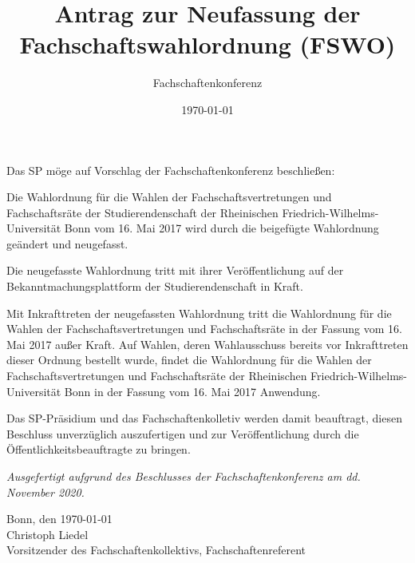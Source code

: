 \documentclass[DIV=12, parskip=half, fontsize=12pt, a4paper]{scrartcl}
\title{Antrag zur Neufassung der Fachschaftswahlordnung (FSWO)}
\author{Fachschaftenkonferenz}
\date{\today}
\begin{document}
	\maketitle
	Das SP möge auf Vorschlag der Fachschaftenkonferenz beschließen:

	\begin{linenumbers}
		Die Wahlordnung für die Wahlen der Fachschaftsvertretungen und Fachschaftsräte der Studierendenschaft der Rheinischen Friedrich-Wilhelms-Universität Bonn vom 16. Mai 2017 wird durch die beigefügte Wahlordnung geändert und neugefasst.

		Die neugefasste Wahlordnung tritt mit ihrer Veröffentlichung auf der Bekanntmachungsplattform der Studierendenschaft in Kraft.

		Mit Inkrafttreten der neugefassten Wahlordnung tritt die Wahlordnung für die Wahlen der Fachschaftsvertretungen und Fachschaftsräte in der Fassung vom 16. Mai 2017 außer Kraft.
		Auf Wahlen, deren Wahlausschuss bereits vor Inkrafttreten dieser Ordnung bestellt wurde, findet die Wahlordnung für die Wahlen der Fachschaftsvertretungen und Fachschaftsräte der Rheinischen Friedrich-Wilhelms-Universität 	Bonn in der Fassung vom 16. Mai 2017 Anwendung.

		Das  SP-Präsidium und das Fachschaftenkolletiv  werden  damit  beauftragt,  diesen Beschluss unverzüglich auszufertigen und zur Veröffentlichung durch die Öffentlichkeitsbeauftragte zu bringen.
	\end{linenumbers}

	\vspace{1em}
	\textit{Ausgefertigt aufgrund des Beschlusses der Fachschaftenkonferenz am dd. November 2020.}

	Bonn, den \today \\
	Christoph Liedel \\
	{\scriptsize Vorsitzender des Fachschaftenkollektivs, Fachschaftenreferent}

	\clearpage
	
\end{document}
